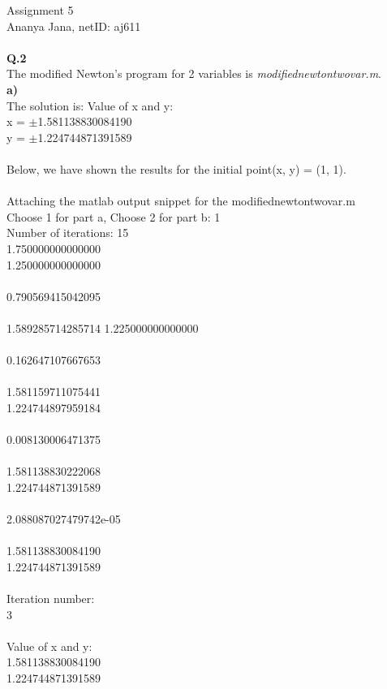 \documentclass{article}
\begin{document}
Assignment 5\\
Ananya Jana, netID: aj611\\
\\
{\bf Q.2}\\
The modified Newton's program for 2 variables is {\it modifiednewtontwovar.m}.\\
{\bf a)}\\
The solution is: Value of x and y: \\
   x = ${\pm}$1.581138830084190\\
   y = ${\pm}$1.224744871391589\\
\\
Below, we have shown the results for the initial point(x, y) = (1, 1).\\
\\
Attaching the matlab output snippet for the modifiednewtontwovar.m\\
Choose 1 for part a, Choose 2 for part b: 1\\
Number of iterations: 15\\
   1.750000000000000\\
   1.250000000000000\\
\\
   0.790569415042095\\
\\
   1.589285714285714
   1.225000000000000\\
\\
   0.162647107667653\\
\\
   1.581159711075441\\
   1.224744897959184\\
\\
   0.008130006471375\\
\\
   1.581138830222068\\
   1.224744871391589\\
\\
     2.088087027479742e-05\\
\\
   1.581138830084190\\
   1.224744871391589\\
\\
Iteration number:\\ 
     3\\
\\
Value of x and y: \\
   1.581138830084190\\
   1.224744871391589\\
\end{document}
